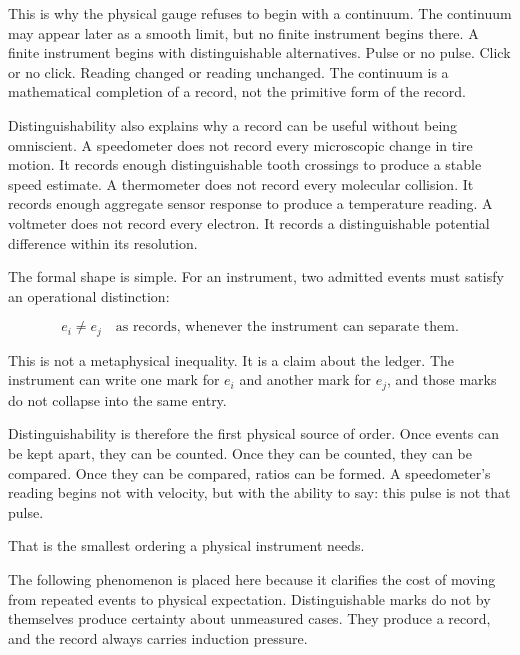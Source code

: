 This is why the physical gauge refuses to begin with a continuum. The continuum
may appear later as a smooth limit, but no finite instrument begins there. A
finite instrument begins with distinguishable alternatives. Pulse or no pulse.
Click or no click. Reading changed or reading unchanged. The continuum is a
mathematical completion of a record, not the primitive form of the record.

Distinguishability also explains why a record can be useful without being
omniscient. A speedometer does not record every microscopic change in tire
motion. It records enough distinguishable tooth crossings to produce a stable
speed estimate. A thermometer does not record every molecular collision. It
records enough aggregate sensor response to produce a temperature reading. A
voltmeter does not record every electron. It records a distinguishable potential
difference within its resolution.

The formal shape is simple. For an instrument, two admitted events must satisfy
an operational distinction:

\[
e_i \neq e_j \quad \text{as records, whenever the instrument can separate them.}
\]

This is not a metaphysical inequality. It is a claim about the ledger. The
instrument can write one mark for $e_i$ and another mark for $e_j$, and those
marks do not collapse into the same entry.

Distinguishability is therefore the first physical source of order. Once events
can be kept apart, they can be counted. Once they can be counted, they can be
compared. Once they can be compared, ratios can be formed. A speedometer's
reading begins not with velocity, but with the ability to say: this pulse is not
that pulse.

That is the smallest ordering a physical instrument needs.

The following phenomenon is placed here because it clarifies the cost of
moving from repeated events to physical expectation. Distinguishable marks do
not by themselves produce certainty about unmeasured cases. They produce a
record, and the record always carries induction pressure.


